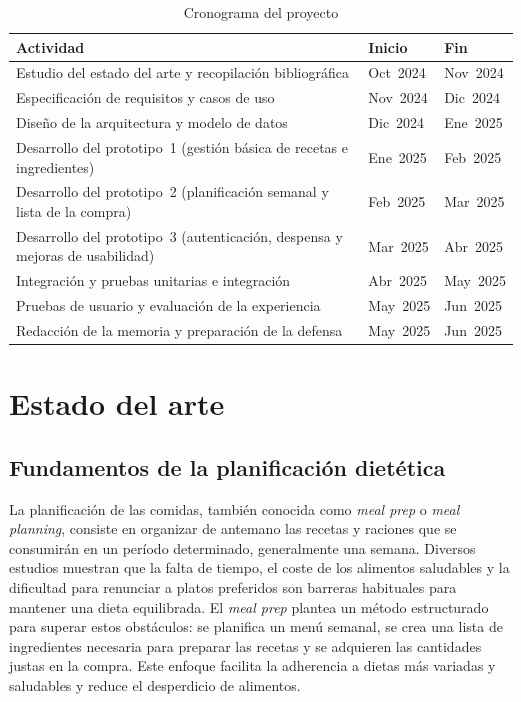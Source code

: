 \documentclass[twoside, openright, 11pt]{report}
\begin{document}
\begin{table}[H]
  \centering
  \caption{Cronograma del proyecto}
  \label{tab:cronograma}
  \begin{tabular}{|p{4cm}|p{3cm}|p{3cm}|}
    \hline
    \textbf{Actividad} & \textbf{Inicio} & \textbf{Fin} \\
    \hline
    Estudio del estado del arte y recopilación bibliográfica & Oct 2024 & Nov 2024 \\
    \hline
    Especificación de requisitos y casos de uso & Nov 2024 & Dic 2024 \\
    \hline
    Diseño de la arquitectura y modelo de datos & Dic 2024 & Ene 2025 \\
    \hline
    Desarrollo del prototipo 1 (gestión básica de recetas e ingredientes) & Ene 2025 & Feb 2025 \\
    \hline
    Desarrollo del prototipo 2 (planificación semanal y lista de la compra) & Feb 2025 & Mar 2025 \\
    \hline
    Desarrollo del prototipo 3 (autenticación, despensa y mejoras de usabilidad) & Mar 2025 & Abr 2025 \\
    \hline
    Integración y pruebas unitarias e integración & Abr 2025 & May 2025 \\
    \hline
    Pruebas de usuario y evaluación de la experiencia & May 2025 & Jun 2025 \\
    \hline
    Redacción de la memoria y preparación de la defensa & May 2025 & Jun 2025 \\
    \hline
  \end{tabular}
\end{table}

\chapter{Estado del arte}
\label{cap.estado}

\section{Fundamentos de la planificación dietética}
\label{sec.fundamentos}
La planificación de las comidas, también conocida como \emph{meal prep} o \emph{meal planning}, consiste en organizar de antemano las recetas y raciones que se consumirán en un período determinado, generalmente una semana. Diversos estudios muestran que la falta de tiempo, el coste de los alimentos saludables y la dificultad para renunciar a platos preferidos son barreras habituales para mantener una dieta equilibrada\cite{NLMDifficultyEatingHealthy}. El \emph{meal prep} plantea un método estructurado para superar estos obstáculos: se planifica un menú semanal, se crea una lista de ingredientes necesaria para preparar las recetas y se adquieren las cantidades justas en la compra. Este enfoque facilita la adherencia a dietas más variadas y saludables y reduce el desperdicio de alimentos.\cite{NLMMealPlanningBenefits}
\end{document}
